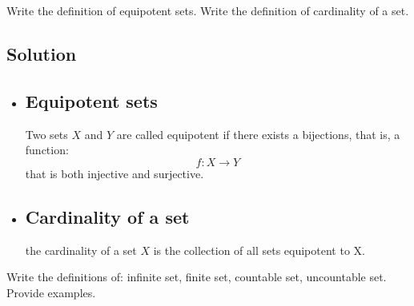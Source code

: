 
\question
Write the definition of equipotent sets. Write the definition of cardinality of a set.

\subsection*{Solution}
\provdefs
\begin{itemize}
    \item \subsection{Equipotent sets} Two sets $X$ and $Y$ are called equipotent if there exists a bijections, that is, a function:
    \[
        f:X\to Y    
    \]
    that is both injective and surjective.
    \item \subsection{Cardinality of a set} the cardinality of a set $X$ is the collection of all sets equipotent to X.
\end{itemize}



\question
Write the definitions of: infinite set, finite set, countable set, uncountable set. Provide examples.

